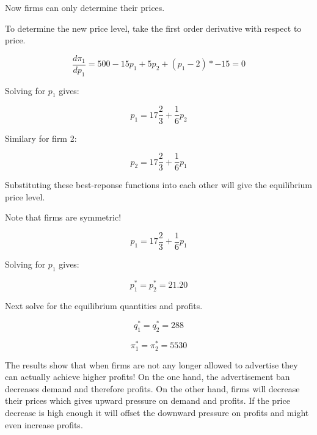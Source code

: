 \documentclass[12pt,english]{article}%
\begin{document}
Now firms can only determine their prices. 

To determine the new price level, take the first order derivative with respect to price. 

\begin{equation}
\frac{d\pi_1}{dp_1}=500-15p_1+5p_2+(p_1-2)*-15=0
\end{equation}

Solving for $p_1$ gives:

\begin{equation}
p_1=17\frac{2}{3}+\frac{1}{6}p_2
\end{equation}

Similary for firm 2:

\begin{equation}
p_2=17\frac{2}{3}+\frac{1}{6}p_1
\end{equation}

Substituting these best-reponse functions into each other will give the equilibrium price level. 

Note that firms are symmetric!

\begin{equation}
p_1=17\frac{2}{3}+\frac{1}{6}p_1
\end{equation}

Solving for $p_1$ gives:

\begin{equation}
p_1^*=p_2^*=21.20
\end{equation}

Next solve for the equilibrium quantities and profits.

\begin{equation}
q_1^*=q_2^*=288
\end{equation}

\begin{equation}
\pi_1^*=\pi_2^*=5530
\end{equation}

The results show that when firms are not any longer allowed to advertise they can actually achieve higher profits!
On the one hand, the advertisement ban decreases demand and therefore profits. On the other hand, firms will decrease their prices which gives upward pressure on demand and profits. If the price decrease is high enough it will offset the downward pressure on profits and might even increase profits. 
\end{document}

